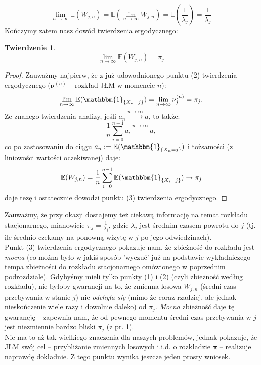 \documentclass[a4paper]{article}
\theoremstyle{defn}
\theoremstyle{theorem}
\newtheorem{theorem}[defn]{Twierdzenie}
\theoremstyle{lemma}
\theoremstyle{cor}
\theoremstyle{fact}
\begin{document}
$$\lim\limits_{n \to \infty} \mathbb{E}(W_{j,n}) = \mathbb{E}\left( \lim\limits_{n \to \infty} W_{j,n}\right) = \mathbb{E}\left(\frac{1}{\lambda_j}\right) = \frac{1}{\lambda_j}$$
Kończymy zatem nasz dowód twierdzenia ergodycznego:
\begin{theorem}\label{theorem2.5.13}
$$\lim\limits_{n \to \infty} \mathbb{E}(W_{j,n}) = \pi_j$$
\end{theorem}
\begin{proof}
Zauważmy najpierw, że z już udowodnionego punktu (2) twierdzenia ergodycznego ($\boldsymbol{\nu}^{(n)}$ – rozkład JŁM w momencie $n$):
$$\lim\limits_{n \to \infty} \mathbb{E}(\mathbbm{1}_{\{X_n = j\}}) = \lim\limits_{n \to \infty} \nu^{(n)}_j = \pi_j.$$
Ze znanego twierdzenia analizy, jeśli $a_n \xrightarrow{n \to \infty} a$, to także: $$\frac{1}{n}\sum_{i=0}^{n-1} a_i \xrightarrow{n \to \infty} a,$$
co po zastosowaniu do ciągu $a_n := \mathbb{E}(\mathbbm{1}_{\{X_n = j\}})$ i tożsamości (z liniowości wartości oczekiwanej) daje:
$$\mathbb{E}(W_{j,n}) = \frac{1}{n} \sum\limits_{i=0}^{n-1} \mathbb{E}(\mathbbm{1}_{\{X_i = j\}}) \to \pi_j$$
daje tezę i ostatecznie dowodzi punktu (3) twierdzenia ergodycznego. 
\end{proof}
Zauważmy, że przy okazji dostajemy też ciekawą informację na temat rozkładu stacjonarnego, mianowicie $\pi_j = \frac{1}{\lambda_j}$, gdzie $\lambda_j$ jest średnim czasem powrotu do $j$ (tj. ile średnio czekamy na ponowną wizytę w $j$ po jego odwiedzinach). 
\\

Punkt (3) twierdzenia ergodycznego pokazuje nam, że zbieżność do rozkładu jest \textit{mocna} (co można było w jakiś sposób 'wyczuć' już na podstawie wykładniczego tempa zbieżności do rozkładu stacjonarnego omówionego w poprzednim podrozdziale). Gdybyśmy mieli tylko punkty (1) i (2) (czyli zbieżność według rozkładu), nie byłoby gwarancji na to, że zmienna losowa $W_{j,n}$ (średni czas przebywania w stanie $j$) nie \textit{odchyla się} (mimo że coraz rzadziej, ale jednak nieskończenie wiele razy i dowolnie daleko) od $\pi_j$. \textit{Mocna} zbieżność daje tę gwarancję – zapewnia nam, że od pewnego momentu średni czas przebywania w $j$ jest niezmiennie bardzo bliski $\pi_j$ (z pr. 1).\\
Nie ma to aż tak wielkiego znaczenia dla naszych problemów, jednak pokazuje, że JŁM swój cel – przybliżanie zmiennych losowych i.i.d. o rozkładzie $\boldsymbol{\pi}$ – realizuje naprawdę dokładnie. Z tego punktu wynika jeszcze jeden prosty wniosek.
\\
\end{document}
